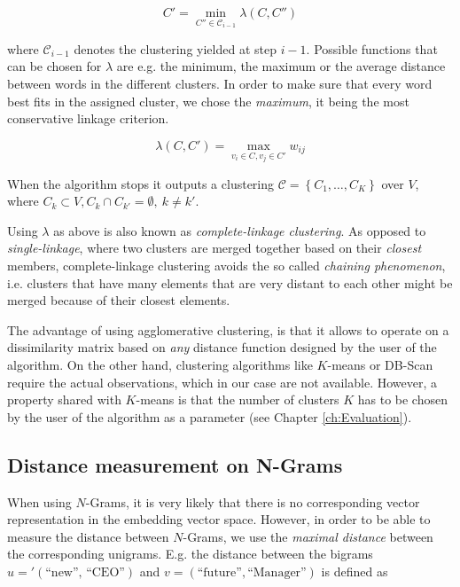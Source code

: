 \begin{equation*}
 C' = \min\limits_{C'' \in \mathcal{C}_{i-1}} \lambda(C,C'') 
\end{equation*}

where $\mathcal{C}_{i-1}$ denotes the clustering yielded at step $i-1$.
Possible functions that can be chosen for $\lambda$ are e.g. the minimum, the
maximum or the average distance between words in the different clusters. 
In order to make sure that every word best fits in the assigned
cluster, we chose the \emph{maximum}, it being the most conservative linkage criterion.  

\begin{equation*}
	\lambda(C,C') = \max\limits_{v_i \in C, v_j \in C' } w_{ij} 
\end{equation*}

When the algorithm stops it outputs a clustering $\mathcal{C} = \left\{ C_1,\ldots,C_K \right\} $ 
over $V$, where $C_k \subset V, C_k \cap C_{k'} = \emptyset,~k \neq
k'$. 

Using $\lambda$ as above is also known as \emph{complete-linkage clustering}.
As opposed to \emph{single-linkage}, where two clusters are merged together
based on their \emph{closest} members, complete-linkage clustering avoids the
so called \emph{chaining phenomenon}, i.e. clusters that have many elements
that are very distant to each other might be merged because of their closest
elements.

The advantage of using agglomerative clustering, is that it allows to operate on
a dissimilarity matrix based on \emph{any} distance function designed by the
user of the algorithm. On the other hand, clustering algorithms like $K$-means
or DB-Scan require the actual observations, which in our case are not available.
 However, a property shared with $K$-means is that the number of clusters $K$ 
 has to be chosen by the user of the algorithm as a parameter (see Chapter
 \ref{ch:Evaluation}).

\subsection{Distance measurement on N-Grams}
\label{ssec:n-grams-distance}
When using $N$-Grams, it is very likely that there is no
corresponding vector representation in the embedding vector space. However, in
order to be able to measure the distance between $N$-Grams, we use the
\emph{maximal distance} between the corresponding unigrams. E.g. the distance
between the bigrams $u='(\text{``new'', ``CEO''})$ and $v=(\text{``future''},
\text{``Manager''})$ is defined as

